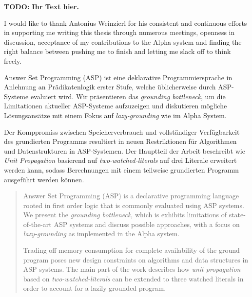 \documentclass{vutinfth} %
\newcommand{\todo}[1]{{\color{red}\textbf{TODO: {#1}}}} %
\begin{document}
\frontmatter %

\addstatementpage

\begin{danksagung*}
\todo{Ihr Text hier.}
\end{danksagung*}

\begin{acknowledgements*}
I would like to thank Antonius Weinzierl for his consistent and continuous efforts in supporting me writing this thesis through numerous meetings, openness in discussion, acceptance of my contributions to the Alpha system and finding the right balance between pushing me to finish and letting me slack off to think freely.
\end{acknowledgements*}

\begin{kurzfassung}
Answer Set Programming (ASP) ist eine deklarative Programmiersprache in Anlehnung an Prädikatenlogik erster Stufe, welche üblicherweise durch ASP-Systeme evaluiert wird. Wir präsentieren das \emph{grounding bottleneck}, um die Limitationen aktueller ASP-Systeme aufzuzeigen und diskutieren mögliche Lösungsansätze mit einem Fokus auf \emph{lazy-grounding} wie im Alpha System.

Der Komppromiss zwischen Speicherverbrauch und vollständiger Verfügbarkeit des grundierten Programms resultiert in neuen Restriktionen für Algorithmen und Datenstrukturen in ASP-Systemen. Der Hauptteil der Arbeit beschreibt wie \emph{Unit Propagation} basierend auf \emph{two-watched-literals} auf drei Literale erweitert werden kann, sodass Berechnungen mit einem teilweise grundierten Programm ausgeführt werden können.
\end{kurzfassung}

\begin{abstract}
Answer Set Programming (ASP) is a declarative programming language rooted in first order logic that is commonly evaluated using ASP systems. We present the \emph{grounding bottleneck}, which is exhibits limitations of state-of-the-art ASP systems and discuss possible approaches, with a focus on \emph{lazy-grounding} as implemented in the Alpha system.

Trading off memory consumption for complete availability of the ground program poses new design constraints on algorithms and data structures in ASP systems. The main part of the work describes how \emph{unit propagation} based on \emph{two-watched-literals} can be extended to three watched literals in order to account for a lazily grounded program.
\end{abstract}
\end{document}
